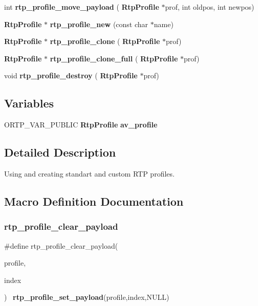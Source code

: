 \begin{DoxyCompactItemize}
\item 
\mbox{\label{rtpprofile_8h_aef9cedef5d47b1783fcf87bf5ed4ff62}} 
int {\bfseries rtp\+\_\+profile\+\_\+move\+\_\+payload} (\textbf{ Rtp\+Profile} $\ast$prof, int oldpos, int newpos)
\item 
\mbox{\label{rtpprofile_8h_ac60ec573e4fc0a9f00d1a43742416dfe}} 
\textbf{ Rtp\+Profile} $\ast$ {\bfseries rtp\+\_\+profile\+\_\+new} (const char $\ast$name)
\item 
\mbox{\label{rtpprofile_8h_aaa659200eb4d1b9f274bd26ef2b385c4}} 
\textbf{ Rtp\+Profile} $\ast$ {\bfseries rtp\+\_\+profile\+\_\+clone} (\textbf{ Rtp\+Profile} $\ast$prof)
\item 
\mbox{\label{rtpprofile_8h_ad9d927aa186f7291a2a9b801d5f4bd59}} 
\textbf{ Rtp\+Profile} $\ast$ {\bfseries rtp\+\_\+profile\+\_\+clone\+\_\+full} (\textbf{ Rtp\+Profile} $\ast$prof)
\item 
\mbox{\label{rtpprofile_8h_afaa522452b64e44f9f58124cde14e200}} 
void {\bfseries rtp\+\_\+profile\+\_\+destroy} (\textbf{ Rtp\+Profile} $\ast$prof)
\end{DoxyCompactItemize}
\subsection*{Variables}
\begin{DoxyCompactItemize}
\item 
\mbox{\label{rtpprofile_8h_ac1a86850c2083c146b8df1aef85541e2}} 
O\+R\+T\+P\+\_\+\+V\+A\+R\+\_\+\+P\+U\+B\+L\+IC \textbf{ Rtp\+Profile} {\bfseries av\+\_\+profile}
\end{DoxyCompactItemize}


\subsection{Detailed Description}
Using and creating standart and custom R\+TP profiles. 



\subsection{Macro Definition Documentation}
\mbox{\label{rtpprofile_8h_a17355c72236a3ca4395a8ef1e1b111a5}} 
\subsubsection{rtp\+\_\+profile\+\_\+clear\+\_\+payload}
{\footnotesize\ttfamily \#define rtp\+\_\+profile\+\_\+clear\+\_\+payload(\begin{DoxyParamCaption}\item[{}]{profile,  }\item[{}]{index }\end{DoxyParamCaption})~\textbf{ rtp\+\_\+profile\+\_\+set\+\_\+payload}(profile,index,N\+U\+LL)}

